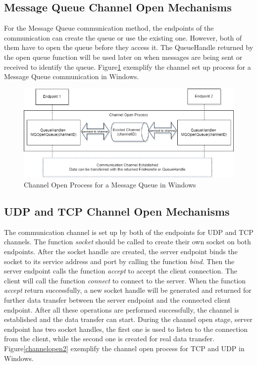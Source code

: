 \subsection{Message Queue Channel Open Mechanisms} 
For the Message Queue communication method, the endpoints of the communication can create the queue or use the existing one. However, both of them have to open the queue before they access it. The QueueHandle returned by the open queue function will be used later on when messages are being sent or received to identify the queue. Figure\ref{msmqopen} exemplify the channel set up process for a Message Queue communication in Windows.
\begin{figure}[H]
\centerline{\includegraphics[scale=0.55]{Figures/msmqchannelopen}}
 \caption{Channel Open Process for a Message Queue in Windows}
\label{msmqopen}
\end{figure}

\subsection{UDP and TCP Channel Open Mechanisms} 
The communication channel is set up by both of the endpoints for UDP and TCP channels. The function \textit{socket} should be called to create their own socket on both endpoints. After the socket handle are created, the server endpoint binds the socket to its service address and port by calling the function \textit{bind}. Then the server endpoint calls the function  \textit{accept} to accept the client connection. The client will call the function \textit{connect} to connect to the server. When the function \textit{accept} return successfully, a new socket handle will be generated and returned for further data transfer between the server endpoint and  the connected client endpoint. After all these operations are performed successfully, the channel is established and the data transfer can start. During the channel open stage, server endpoint has two socket handles, the first one is used to listen to the connection from the client, while the second one is created for real data transfer. Figure\ref{channelopen2} exemplify the channel open process for TCP and UDP  in Windows.
    
